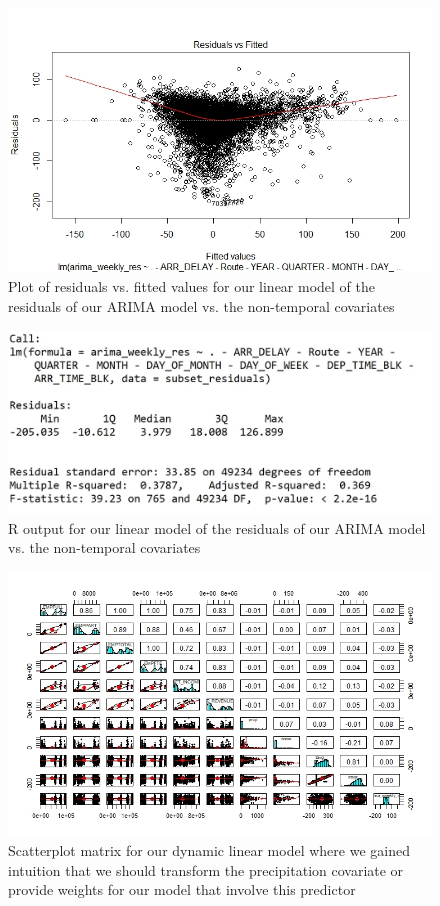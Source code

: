 \documentclass[12pt, a4paper, openany]{book}
\begin{document}
			\begin{figure}[h]
			\centering
	 		\includegraphics[width = 1 \textwidth]{../figures/plot1_residualLM}
	 		\caption{Plot of residuals vs. fitted values for our linear model of the residuals of our ARIMA model vs. the non-temporal covariates}
	 		\end{figure}
	 		
			\begin{figure}[h]
			\centering
	 		\includegraphics[width = .8 \textwidth]{../figures/non_weighted_lm_output}
	 		\caption{R output for our linear model of the residuals of our ARIMA model vs. the non-temporal covariates}
	 		\end{figure}
	 		
	 		\begin{figure}[h]
			\centering
	 		\includegraphics[width = 1 \textwidth]{../figures/pairs.panels2_res}
	 		\caption{Scatterplot matrix for our dynamic linear model where we gained intuition that we should transform the precipitation covariate or provide weights for our model that involve this predictor}
	 		\end{figure}
\end{document}
